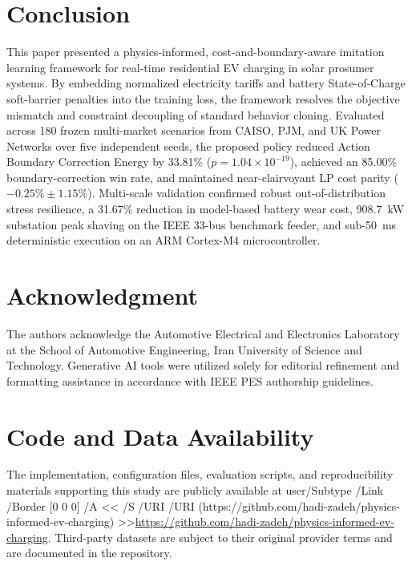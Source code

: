 \documentclass[journal]{IEEEtran}
\theoremstyle{remark}
\newcommand{\hreflink}[2]{\pdfstartlink user{/Subtype /Link /Border [0 0 0] /A << /S /URI /URI (#1) >>}#2\pdfendlink}
\begin{document}
\section{Conclusion}
This paper presented a physics-informed, cost-and-boundary-aware imitation learning framework for real-time residential EV charging in solar prosumer systems. By embedding normalized electricity tariffs and battery State-of-Charge soft-barrier penalties into the training loss, the framework resolves the objective mismatch and constraint decoupling of standard behavior cloning. Evaluated across 180 frozen multi-market scenarios from CAISO, PJM, and UK Power Networks over five independent seeds, the proposed policy reduced Action Boundary Correction Energy by 33.81\% ($p = 1.04 \times 10^{-19}$), achieved an 85.00\% boundary-correction win rate, and maintained near-clairvoyant LP cost parity ($-0.25\% \pm 1.15\%$). Multi-scale validation confirmed robust out-of-distribution stress resilience, a 31.67\% reduction in model-based battery wear cost, 908.7~kW substation peak shaving on the IEEE 33-bus benchmark feeder, and sub-50~ms deterministic execution on an ARM Cortex-M4 microcontroller.

\section*{Acknowledgment}
The authors acknowledge the Automotive Electrical and Electronics Laboratory at the School of Automotive Engineering, Iran University of Science and Technology. Generative AI tools were utilized solely for editorial refinement and formatting assistance in accordance with IEEE PES authorship guidelines.

\section*{Code and Data Availability}
The implementation, configuration files, evaluation scripts, and reproducibility materials supporting this study are publicly available at \hreflink{https://github.com/hadi-zadeh/physics-informed-ev-charging}{\url{https://github.com/hadi-zadeh/physics-informed-ev-charging}}. Third-party datasets are subject to their original provider terms and are documented in the repository.
\end{document}
